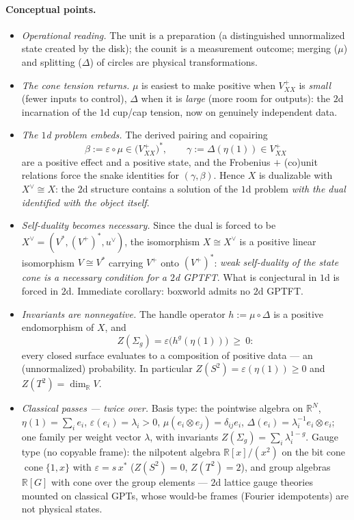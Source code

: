 \documentclass[prl,aps,10pt,superscriptaddress,floatfix]{revtex4-2}
\begin{document}
\paragraph{Conceptual points.}
\begin{itemize}
\item \emph{Operational reading.} The unit is a preparation (a distinguished unnormalized state created by the disk); the counit is a measurement outcome; merging ($\mu$) and splitting ($\Delta$) of circles are physical transformations.
\item \emph{The cone tension returns.} $\mu$ is easiest to make positive when $V^+_{XX}$ is \emph{small} (fewer inputs to control), $\Delta$ when it is \emph{large} (more room for outputs): the $2$d incarnation of the $1$d cup/cap tension, now on genuinely independent data.
\item \emph{The $1$d problem embeds.} The derived pairing and copairing
\[
\beta:=\varepsilon\circ\mu\in\big(V^+_{XX}\big)^*,\qquad
\gamma:=\Delta(\eta(1))\in V^+_{XX}
\]
are a positive effect and a positive state, and the Frobenius $+$ (co)unit relations force the snake identities for $(\gamma,\beta)$. Hence $X$ is dualizable with $X^\vee\cong X$: the $2$d structure contains a solution of the $1$d problem \emph{with the dual identified with the object itself}.
\item \emph{Self-duality becomes necessary.} Since the dual is forced to be $X^\vee=(V^*,(V^+)^*,u^\vee)$, the isomorphism $X\cong X^\vee$ is a positive linear isomorphism $V\cong V^*$ carrying $V^+$ onto $(V^+)^*$: \emph{weak self-duality of the state cone is a necessary condition for a $2$d GPTFT}. What is conjectural in $1$d is forced in $2$d. Immediate corollary: boxworld admits no $2$d GPTFT.
\item \emph{Invariants are nonnegative.} The handle operator $h:=\mu\circ\Delta$ is a positive endomorphism of $X$, and
\[
Z(\Sigma_g)=\varepsilon\big(h^g(\eta(1))\big)\ \ge\ 0 :
\]
every closed surface evaluates to a composition of positive data --- an (unnormalized) probability. In particular $Z(S^2)=\varepsilon(\eta(1))\ge0$ and $Z(T^2)=\dim_{\mathbb R}V$.
\item \emph{Classical passes --- twice over.} Basis type: the pointwise algebra on $\mathbb{R}^N$, $\eta(1)=\sum_ie_i$, $\varepsilon(e_i)=\lambda_i>0$, $\mu(e_i\otimes e_j)=\delta_{ij}e_i$, $\Delta(e_i)=\lambda_i^{-1}e_i\otimes e_i$; one family per weight vector $\lambda$, with invariants $Z(\Sigma_g)=\sum_i\lambda_i^{1-g}$. Gauge type (no copyable frame): the nilpotent algebra $\mathbb{R}[x]/(x^2)$ on the bit cone $\operatorname{cone}\{1,x\}$ with $\varepsilon=s\,x^*$ ($Z(S^2)=0$, $Z(T^2)=2$), and group algebras $\mathbb{R}[G]$ with cone over the group elements --- $2$d lattice gauge theories mounted on classical GPTs, whose would-be frames (Fourier idempotents) are not physical states.

\end{itemize}
\end{document}
